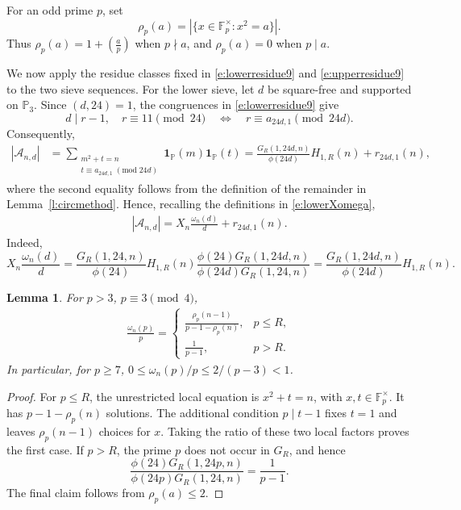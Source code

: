\documentclass[12pt,reqno]{amsart}
\numberwithin{equation}{section}
\newtheorem{lemma}[equation]{Lemma}
\theoremstyle{definition}
\theoremstyle{remark}
\newcommand{\one}{\mathbf{1}}
\begin{document}
For an odd prime \(p\), set
\[
 \rho_p(a)=|\{x\in\mathbb F_p^\times:x^2=a\}|.
\]
Thus \(\rho_p(a)=1+(\frac ap)\) when \(p\nmid a\), and
\(\rho_p(a)=0\) when \(p\mid a\).

We now apply the residue classes fixed in
\eqref{e:lowerresidue9} and \eqref{e:upperresidue9} to the two sieve
sequences.  For the lower sieve, let \(d\) be square-free and supported
on \(\mathbb P_3\).  Since \((d,24)=1\), the congruences in
\eqref{e:lowerresidue9} give
\[
 d\mid r-1,\quad r\equiv11\pmod{24}
 \quad\Longleftrightarrow\quad
 r\equiv a_{24d,1}\pmod{24d}.
\]
Consequently,
\begin{align*}
 |\mathcal A_{n,d}|
 &=
 \sum_{\substack{m^2+t=n\\
 t\equiv a_{24d,1}\;(\mathrm{mod}\;24d)}}
 \one_{\mathbb P}(m)\one_{\mathbb P}(t)=
 \frac{G_R(1,24d,n)}{\phi(24d)}H_{1,R}(n)
 +r_{24d,1}(n),
\end{align*}
where the second equality follows from the definition of the remainder
in Lemma~\ref{l:circmethod}. Hence, recalling the definitions in \eqref{e:lowerXomega},
\begin{align}\label{e:lowersequence10}
 |\mathcal A_{n,d}|
 =
 X_n\frac{\omega_n(d)}d+r_{24d,1}(n).
\end{align}
Indeed,
\[
 X_n\frac{\omega_n(d)}d
 =
 \frac{G_R(1,24,n)}{\phi(24)}H_{1,R}(n)
 \frac{\phi(24)G_R(1,24d,n)}
      {\phi(24d)G_R(1,24,n)}
 =
 \frac{G_R(1,24d,n)}{\phi(24d)}H_{1,R}(n).
\]


\begin{lemma}\label{l:lowerlocaldensity}
For \(p>3\), \(p\equiv3\pmod4\),
\begin{align}\label{e:lowerlocaldensity10}
 \frac{\omega_n(p)}p
 =
 \begin{cases}
 \displaystyle
 \frac{\rho_p(n-1)}{p-1-\rho_p(n)},&p\leq R,\\[7pt]
 \displaystyle\frac1{p-1},&p>R.
 \end{cases}
\end{align}
In particular, for \(p\geq7\),
\(0\leq\omega_n(p)/p\leq2/(p-3)<1\).
\end{lemma}

\begin{proof}
For \(p\leq R\), the unrestricted local equation is
\(x^2+t=n\), with \(x,t\in\mathbb F_p^\times\).  It has
\(p-1-\rho_p(n)\) solutions.  The additional condition
\(p\mid t-1\) fixes \(t=1\) and leaves \(\rho_p(n-1)\) choices for
\(x\).  Taking the ratio of these two local factors proves the first
case.  If \(p>R\), the prime \(p\) does not occur in \(G_R\), and hence
\[
 \frac{\phi(24)G_R(1,24p,n)}
 {\phi(24p)G_R(1,24,n)}=\frac1{p-1}.
\]
The final claim follows from \(\rho_p(a)\leq2\).
\end{proof}
\end{document}
